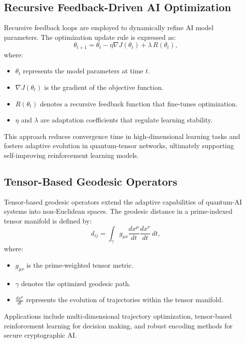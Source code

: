 \documentclass{article}
\theoremstyle{plain}
\begin{document}
\subsection{Recursive Feedback-Driven AI Optimization}

Recursive feedback loops are employed to dynamically refine AI model parameters. The optimization update rule is expressed as:
\begin{equation}
\theta_{t+1} = \theta_t - \eta \nabla J(\theta_t) + \lambda\, R(\theta_t),
\end{equation}
where:
\begin{itemize}
    \item \(\theta_t\) represents the model parameters at time \(t\).
    \item \(\nabla J(\theta_t)\) is the gradient of the objective function.
    \item \(R(\theta_t)\) denotes a recursive feedback function that fine-tunes optimization.
    \item \(\eta\) and \(\lambda\) are adaptation coefficients that regulate learning stability.
\end{itemize}
This approach reduces convergence time in high-dimensional learning tasks and fosters adaptive evolution in quantum-tensor networks, ultimately supporting self-improving reinforcement learning models.

\subsection{Tensor-Based Geodesic Operators}

Tensor-based geodesic operators extend the adaptive capabilities of quantum-AI systems into non-Euclidean spaces. The geodesic distance in a prime-indexed tensor manifold is defined by:
\begin{equation}
d_{ij} = \int_{\gamma} g_{\mu\nu} \frac{dx^\mu}{dt}\frac{dx^\nu}{dt}\, dt,
\end{equation}
where:
\begin{itemize}
    \item \(g_{\mu\nu}\) is the prime-weighted tensor metric.
    \item \(\gamma\) denotes the optimized geodesic path.
    \item \(\frac{dx^\mu}{dt}\) represents the evolution of trajectories within the tensor manifold.
\end{itemize}
Applications include multi-dimensional trajectory optimization, tensor-based reinforcement learning for decision making, and robust encoding methods for secure cryptographic AI.
\end{document}
